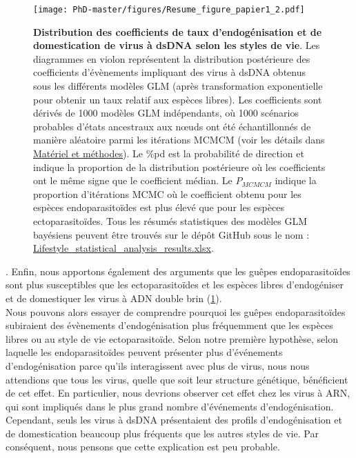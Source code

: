 \begin{figure}[H]
\captionsetup{font=footnotesize}
 \centering
  \texttt{[image: PhD-master/figures/Resume\_figure\_papier1\_2.pdf]}
\caption[Paper1:Figures principales récapitulatives du chapitre1\_2]{\textbf{Distribution des coefficients de taux d'endogénisation et de domestication de virus à dsDNA selon les styles de vie}. Les diagrammes en violon représentent la distribution postérieure des coefficients d'évènements impliquant des virus à dsDNA obtenus sous les différents modèles GLM (après transformation exponentielle pour obtenir un taux relatif aux espèces libres). Les coefficients sont dérivés de 1000 modèles GLM indépendants, où 1000 scénarios probables d'états ancestraux aux nœuds ont été échantillonnés de manière aléatoire parmi les itérations MCMCM (voir les détails dans \hyperref[sec:MM-12]{Matériel et méthodes}). Le \%pd est la probabilité de direction et indique la proportion de la distribution postérieure où les coefficients ont le même signe que le coefficient médian. Le $P_{MCMCM}$ indique la proportion d'itérations MCMC où le coefficient obtenu pour les espèces endoparasitoïdes est plus élevé que pour les espèces ectoparasitoïdes. Tous les résumés statistiques des modèles GLM bayésiens peuvent être trouvés sur le dépôt GitHub sous le nom : \href{https://github.com/BenjaminGuinet/PhD_defense/blob/main/Supplementary_paper1/Lifestyle_statistical_analysis_results.xlsx}{Lifestyle\_statistical\_analysis\_results.xlsx}.}
\label{figure:Resume_figure_papier1_2}
\end{figure}

.\newline
Enfin, nous apportons également des arguments que les guêpes endoparasitoïdes sont plus susceptibles que les ectoparasitoïdes et les espèces libres d'endogéniser et de domestiquer les virus à ADN double brin (\figurename{\ref{figure:Resume_figure_papier1_2}}).\\

Nous pouvons alors essayer de comprendre pourquoi les guêpes endoparasitoïdes subiraient des évènements d'endogénisation plus fréquemment que les espèces libres ou au style de vie ectoparasitoïde. Selon notre première hypothèse, selon laquelle les endoparasitoïdes peuvent présenter plus d'événements d'endogénisation parce qu'ils interagissent avec plus de virus, nous nous attendions que tous les virus, quelle que soit leur structure génétique, bénéficient de cet effet. En particulier, nous devrions observer cet effet chez les virus à ARN, qui sont impliqués dans le plus grand nombre d'événements d'endogénisation. Cependant, seuls les virus à dsDNA présentaient des profils d’endogénisation et de domestication beaucoup plus fréquents que les autres styles de vie. Par conséquent, nous pensons que cette explication est peu probable. \\


